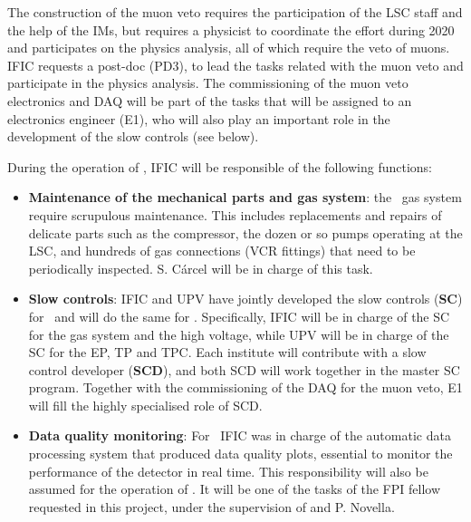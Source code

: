 The construction of the muon veto requires the participation of the LSC staff and the help of the IMs, but requires a physicist to coordinate the effort during 2020 and participates on the physics analysis, all of which require the veto of muons.  IFIC requests a post-doc (PD3), to lead the tasks related with the muon veto and participate in the physics analysis. The commissioning of the muon veto electronics and DAQ will  be part of the tasks that will be assigned to an electronics engineer (E1), who will also play an important role in the development of the slow controls (see below). 

During the operation of \Next, IFIC will be responsible of the following functions:

\begin{itemize}[noitemsep,topsep=0pt,parsep=0pt,partopsep=0pt]
    \item {\bf Maintenance of the mechanical parts and gas system}:  the \Next\ gas system require scrupulous maintenance. This includes replacements and repairs of delicate parts such as the compressor, the dozen or so pumps operating at the LSC, and hundreds of gas connections (VCR fittings) that need to be periodically inspected. S. C\'arcel will be in charge of this task.
    \item {\bf Slow controls}: IFIC and UPV have jointly developed the slow controls ({\bf SC}) for \NEW\ and will do the same for \Next. Specifically, IFIC will be in charge of the SC for the gas system and the high voltage, while UPV will be in charge of the SC for the EP, TP and TPC. Each institute will contribute with a slow control developer ({\bf SCD}), and both SCD will work together in the master SC program. Together with the commissioning of the DAQ for the muon veto, E1 will fill the highly specialised role of SCD.  
    \item {\bf Data quality monitoring}: For \NEW\ IFIC was in charge of the automatic data processing system that produced data quality plots, essential to monitor the performance of the detector in real time. This responsibility will also be assumed for the operation of \Next. It will be one of the tasks of the FPI fellow requested in this project, under the supervision of and P. Novella.   
\end{itemize}

